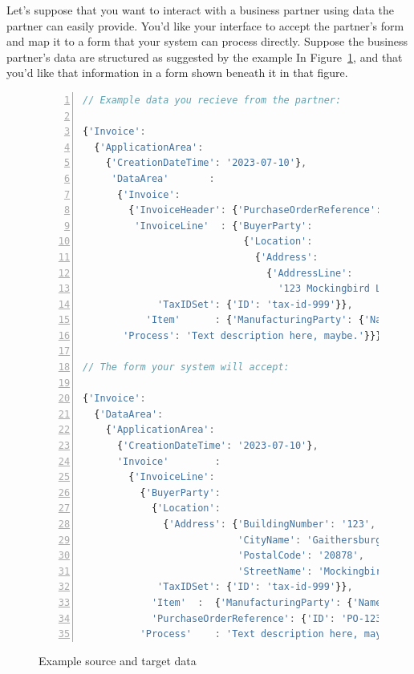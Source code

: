 \documentclass[10pt,letterpaper]{article} %
\begin{document}
Let's suppose that you want to interact with a business partner using data the partner can easily provide.
You'd like your interface to accept the partner's form and map it to a form that your system can process directly.
Suppose the business partner's data are structured as suggested by the example In Figure~\ref{fig:data-for-end-to-end}, and that you'd like that information in a form shown beneath it in that figure.

\begin{figure}[H]
  \caption{Example source and target data}
  \label{fig:data-for-end-to-end}
\begin{lstlisting}[language=JavaScript,numberstyle=\scriptsize,basicstyle=\ttfamily\scriptsize,numbers=left,stepnumber=1,breaklines=true]
// Example data you recieve from the partner:

{'Invoice':
  {'ApplicationArea':
    {'CreationDateTime': '2023-07-10'},
     'DataArea'       :
      {'Invoice':
        {'InvoiceHeader': {'PurchaseOrderReference': {'ID': 'PO-1234'}},
         'InvoiceLine'  : {'BuyerParty':
                            {'Location':
                              {'Address':
                                {'AddressLine':
                                  '123 Mockingbird Lane, Gaithersburg MD, 20878'}},
             'TaxIDSet': {'ID': 'tax-id-999'}},
           'Item'      : {'ManufacturingParty': {'Name': 'Acme Widget'}}}},
       'Process': 'Text description here, maybe.'}}}

// The form your system will accept:

{'Invoice':
  {'DataArea':
    {'ApplicationArea':
      {'CreationDateTime': '2023-07-10'},
      'Invoice'        :
        {'InvoiceLine':
          {'BuyerParty':
            {'Location':
              {'Address': {'BuildingNumber': '123',
                           'CityName': 'Gaithersburg',
                           'PostalCode': '20878',
                           'StreetName': 'Mockingbird Lane'}},
             'TaxIDSet': {'ID': 'tax-id-999'}},
            'Item'  :  {'ManufacturingParty': {'Name': 'Acme Widget'}},
            'PurchaseOrderReference': {'ID': 'PO-1234'}},
          'Process'    : 'Text description here, maybe.'}}}}
\end{lstlisting}
\end{figure} \vspace{-3em}
\end{document}
